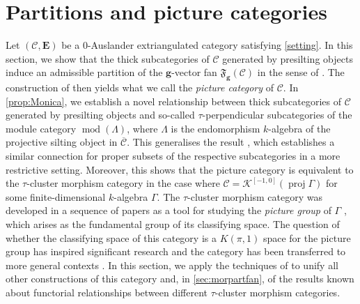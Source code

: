 \documentclass[10pt,twoside, a4paper,reqno]{amsart}
\DeclareMathOperator{\mods}{mod}
\DeclareMathOperator{\proj}{proj}
\newcommand{\Ktwo}{\mathcal{K}^{[-1,0]}}
\newcommand{\partfan}[1]{\mathfrak{F}_{\bfg}(#1)}
\newcommand{\calC}{\mathcal{C}}
\newcommand{\E}{\mathbf{E}}
\newcommand{\bfg}{\mathbf{g}}
\theoremstyle{definition}
\begin{document}
\section{Partitions and picture categories}\label{sec:part}
Let $(\calC,\E)$ be a 0-Auslander extriangulated category satisfying \cref{setting}. In this section, we show that the thick subcategories of $\calC$ generated by presilting objects induce an admissible partition of the $\bfg$-vector fan $\partfan{\calC}$ in the sense of \cite{Kai23}. The construction of \cite{Kai23} then yields what we call the \textit{picture category} of $\calC$. In \cref{prop:Monica}, we establish a novel relationship between thick subcategories of $\calC$ generated by presilting objects and so-called $\tau$-perpendicular subcategories of the module category $\mods(\Lambda)$, where $\Lambda$ is the endomorphism $k$-algebra of the projective silting object in {$\overline{\calC}$}. This generalises the result \cite[{Prop.} 4.21]{Gar24}, which establishes a similar connection for proper subsets of the respective subcategories in a more restrictive setting. Moreover, this shows that the picture category is equivalent to the $\tau$-cluster morphism category in the case where $\calC = \Ktwo(\proj \Gamma)$ for some finite-dimensional $k$-algebra $\Gamma$. The $\tau$-cluster morphism category was developed in a sequence of papers \cite{IT17, BM18w, BH21} as a tool for studying the \textit{picture group} of $\Gamma$ \cite{ITW16}, which arises as the fundamental group of its classifying space. The question of whether the classifying space of this category is a $K(\pi,1)$ space for the picture group has inspired significant research \cite{BorMot,BorveKaipeltautilt,HI21,HI21p,Kai24} and the category has been transferred to more general contexts \cite{Bor21,Bor24, Kai23}. In this section, we apply the techniques of \cite{Kai23} to unify all other constructions of this category and, in \cref{sec:morpartfan}, of the results known about functorial relationships between different $\tau$-cluster morphism categories.
\end{document}
